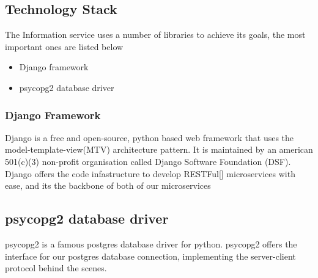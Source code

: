 		\subsection{Technology Stack}
			The Information service uses a number of libraries to achieve its goals, the most important ones are listed below
			\begin{itemize}
				\item Django framework
				\item psycopg2 database driver
			\end{itemize}	
			\subsubsection{Django Framework}
				\label{django}
				Django is a free and open-source, python based web framework that uses the model-template-view(MTV) architecture pattern. 
				It is maintained by an american  501(c)(3) non-profit organisation called Django Software Foundation (DSF). Django offers 
				the code infastructure to develop RESTFul[\cite{restful-rfc7231}] microservices with ease, and its the backbone of both of our
				microservices
			\subsection{psycopg2 database driver}
				\label{psycopg2}
				psycopg2 is a famous postgres database driver for python. psycopg2 offers the interface for our postgres database connection, 
				implementing the server-client protocol behind the scenes.
